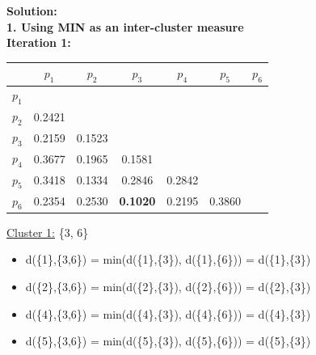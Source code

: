 \documentclass[11pt]{article}
\begin{document}
	\textbf{Solution:}\\
	
	\textbf{1. Using MIN as an inter-cluster measure} \\
	
	\textbf{Iteration 1:}
	
	\begin{center}
    	\begin{adjustbox}{max width=\textwidth}
		\begin{tabular}{ | c | c | c | c | c | c | c |}
	  	 	\hline

	  	 	& \textbf{$p_1$} & \textbf{$p_2$} & \textbf{$p_3$} & \textbf{$p_4$} & \textbf{$p_5$} & \textbf{$p_6$}\\
	  	 	\hline
	  	 	
	  	 	\textbf{$p_1$} &  &  &  &  &  &\\
	  	 	\hline
	  	 	
	  	 	\textbf{$p_2$} & 0.2421 &  &  &  &  &  \\
	  	 	\hline
	  	 	
	  	 	\textbf{$p_3$} & 0.2159 & 0.1523 &  &  &  & \\
	  	 	\hline
	  	 	
	  	 	\textbf{$p_4$} & 0.3677 & 0.1965 & 0.1581 &  &  & \\
	  	 	\hline
	  	 	
	  	 	\textbf{$p_5$} & 0.3418 & 0.1334 & 0.2846 & 0.2842 &  & \\
	  	 	\hline	
	  	 	
	  	 	\textbf{$p_6$} & 0.2354 & 0.2530 & \textbf{0.1020} & 0.2195 & 0.3860 & \\
	  	 	\hline			
    		\end{tabular}
    	\end{adjustbox}
	\end{center}
	
	\underline{Cluster 1:} \{3, 6\}
	
	\begin{itemize}
		\item d(\{1\},\{3,6\}) = min(d(\{1\},\{3\}), d(\{1\},\{6\})) = d(\{1\},\{3\})
		\item d(\{2\},\{3,6\}) = min(d(\{2\},\{3\}), d(\{2\},\{6\})) = d(\{2\},\{3\})
		\item d(\{4\},\{3,6\}) = min(d(\{4\},\{3\}), d(\{4\},\{6\})) = d(\{4\},\{3\})
		\item d(\{5\},\{3,6\}) = min(d(\{5\},\{3\}), d(\{5\},\{6\})) = d(\{5\},\{3\})
	\end{itemize}
	
\end{document}
